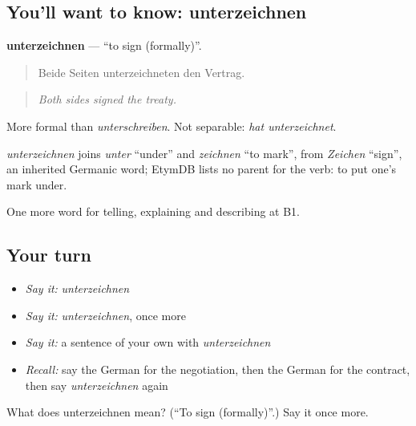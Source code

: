 \subsection*{You'll want to know: unterzeichnen}
\textbf{unterzeichnen} — \textquotedblleft{}to sign (formally)\textquotedblright{}.

\begin{quote}
Beide Seiten unterzeichneten den Vertrag.
\end{quote}

\begin{quote}
\emph{Both sides signed the treaty.}
\end{quote}

More formal than \emph{unterschreiben}. Not separable: \emph{hat unterzeichnet}.

\begin{cousinweb}
\emph{unterzeichnen} joins \emph{unter} \textquotedblleft{}under\textquotedblright{} and \emph{zeichnen} \textquotedblleft{}to mark\textquotedblright{}, from \emph{Zeichen} \textquotedblleft{}sign\textquotedblright{}, an inherited Germanic word; EtymDB lists no parent for the verb: to put one's mark under.
\end{cousinweb}

\begin{grammarlens}[title={What you've built}]
One more word for telling, explaining and describing at B1.
\end{grammarlens}

\subsection*{Your turn}
\begin{itemize}
\raggedright
  \item \emph{Say it:} \emph{unterzeichnen}
  \item \emph{Say it:} \emph{unterzeichnen}, once more
  \item \emph{Say it:} a sentence of your own with \emph{unterzeichnen}
  \item \emph{Recall:} say the German for the negotiation, then the German for the contract, then say \emph{unterzeichnen} again
\end{itemize}

\begin{tcolorbox}[breakable,colback=teal!4,colframe=teal!35!black,title={Before you move on}]
What does unterzeichnen mean? (\textquotedblleft{}To sign (formally)\textquotedblright{}.) Say it once more.
\end{tcolorbox}
